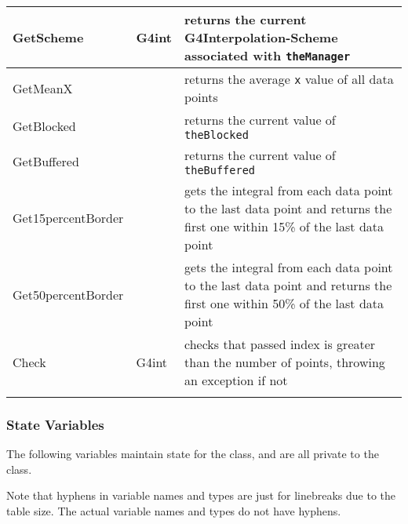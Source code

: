 \documentclass[12pt]{article}
\begin{document}
\begin{longtable}{p{}p{}p{}}
GetScheme & G4int & returns the current G4Interpolation-Scheme associated with \texttt{theManager}\\\hline
GetMeanX & & returns the average \texttt{x} value of all data points\\\hline
GetBlocked & & returns the current value of \texttt{theBlocked}\\\hline
GetBuffered & &  returns the current value of \texttt{theBuffered}\\\hline
Get15percentBorder & & gets the integral from each data point to the last data point and returns the first one within 
15\% of the last data point \\\hline
Get50percentBorder & & gets the integral from each data point to the last data point and returns the first one within 
50\% of the last data point\\\hline
Check & G4int & checks that passed index is greater than the number of points, throwing an exception if not\\
\arrayrulecolor{black}
\bottomrule
\end{longtable}

\subsubsection{State Variables}%
The following variables maintain state for the class, and are all private to the class.

Note that hyphens in variable names and types are just for linebreaks due to the table size. The actual variable names and types do not have hyphens.
\end{document}
